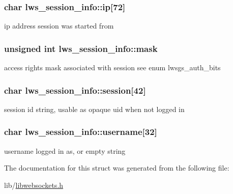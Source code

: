\subsubsection[{\texorpdfstring{ip}{ip}}]{\setlength{\rightskip}{0pt plus 5cm}char lws\+\_\+session\+\_\+info\+::ip\mbox{[}72\mbox{]}}\hypertarget{structlws__session__info_a53eed02325e8717a53297391e3e98fac}{}\label{structlws__session__info_a53eed02325e8717a53297391e3e98fac}
ip address session was started from 
\subsubsection[{\texorpdfstring{mask}{mask}}]{\setlength{\rightskip}{0pt plus 5cm}unsigned int lws\+\_\+session\+\_\+info\+::mask}\hypertarget{structlws__session__info_afb924864b70f40372920688a5c1c895e}{}\label{structlws__session__info_afb924864b70f40372920688a5c1c895e}
access rights mask associated with session see enum lwsgs\+\_\+auth\+\_\+bits 
\subsubsection[{\texorpdfstring{session}{session}}]{\setlength{\rightskip}{0pt plus 5cm}char lws\+\_\+session\+\_\+info\+::session\mbox{[}42\mbox{]}}\hypertarget{structlws__session__info_a4353b5dd19400b2b15edfd7cee1e4cd5}{}\label{structlws__session__info_a4353b5dd19400b2b15edfd7cee1e4cd5}
session id string, usable as opaque uid when not logged in 
\subsubsection[{\texorpdfstring{username}{username}}]{\setlength{\rightskip}{0pt plus 5cm}char lws\+\_\+session\+\_\+info\+::username\mbox{[}32\mbox{]}}\hypertarget{structlws__session__info_a3d57a70b6e7181d95a8bec429b1a7697}{}\label{structlws__session__info_a3d57a70b6e7181d95a8bec429b1a7697}
username logged in as, or empty string 

The documentation for this struct was generated from the following file\+:\begin{DoxyCompactItemize}
\item 
lib/\hyperlink{libwebsockets_8h}{libwebsockets.\+h}\end{DoxyCompactItemize}
